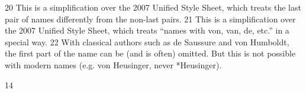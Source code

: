  	
 	
 	
 	
 	
 	
 	
 	
 	
 	
 	
 	
 	
 	
 	
 	
 	
 	
 	
 	
 	
 	
 	
 	
 	
 	
 	
 	
 	
 	
 	
 	
 	
 	
 	
 	
 	
 	
	
 
20
This is a simplification over the 2007 Unified Style Sheet, which treats the last pair of names differently
from the non-last pairs.
21
This is a simplification over the 2007 Unified Style Sheet, which treats “names with von, van, de, etc.” in a
special way.
22
With classical authors such as de Saussure and von Humboldt, the first part of the name can be (and is often)
omitted. But this is not possible with modern names (e.g. von Heusinger, never *Heusinger).
	
 
 14	
  
